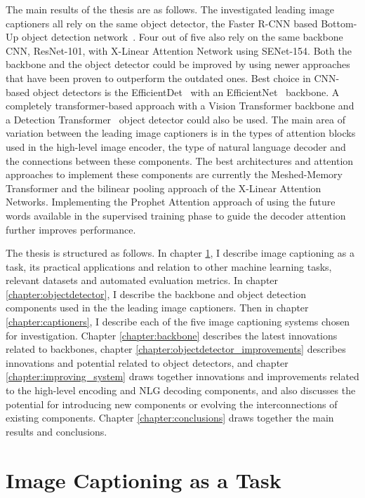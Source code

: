 \documentclass[english,twoside,openright]{HYgraduMLDS}
\begin{document}
The main results of the thesis are as follows. The investigated leading image captioners all rely on the same object detector, the Faster R-CNN based Bottom-Up object detection network~\cite{BottomUp}. Four out of five also rely on the same backbone CNN, ResNet-101, with X-Linear Attention Network using SENet-154. Both the backbone and the object detector could be improved by using newer approaches that have been proven to outperform the outdated ones. Best choice in CNN-based object detectors is the EfficientDet~\cite{EfficientDet} with an EfficientNet~\cite{EfficientNet} backbone. A completely transformer-based approach with a Vision Transformer\cite{VisionTransformers} backbone and a Detection Transformer~\cite{DETR} object detector could also be used. The main area of variation between the leading image captioners is in the types of attention blocks used in the high-level image encoder, the type of natural language decoder and the connections between these components. The best architectures and attention approaches to implement these components are currently the Meshed-Memory Transformer and the bilinear pooling approach of the X-Linear Attention Networks. Implementing the Prophet Attention approach of using the future words available in the supervised training phase to guide the decoder attention further improves performance.

The thesis is structured as follows. In chapter \ref{chapter:imagecaptioning}, I describe image captioning as a task, its practical applications and relation to other machine learning tasks, relevant datasets and automated evaluation metrics. In chapter \ref{chapter:objectdetector}, I describe the backbone and object detection components used in the the leading image captioners. Then in chapter \ref{chapter:captioners}, I describe each of the five image captioning systems chosen for investigation. Chapter \ref{chapter:backbone} describes the latest innovations related to backbones, chapter \ref{chapter:objectdetector_improvements} describes innovations and potential related to object detectors, and chapter \ref{chapter:improving_system} draws together innovations and improvements related to the high-level encoding and NLG decoding components, and also discusses the potential for introducing new components or evolving the interconnections of existing components. Chapter \ref{chapter:conclusions} draws together the main results and conclusions.

\chapter{Image Captioning as a Task}
\label{chapter:imagecaptioning}
\end{document}
